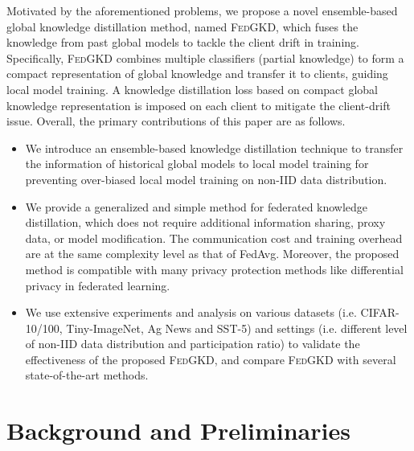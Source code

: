 \documentclass{article} %
\newcommand{\system}{\textsc{FedGKD}\xspace}
\begin{document}
Motivated by the aforementioned problems, we propose a novel ensemble-based global knowledge distillation method, named \system, which fuses the knowledge from past global models to tackle the client drift in training. Specifically, \system combines multiple  classifiers (partial knowledge) to form a compact representation of global knowledge and transfer it to clients, guiding local model training. 
A knowledge distillation loss based on compact global knowledge representation is imposed on each client to mitigate the client-drift issue.
Overall, the primary contributions of this paper are as follows.
\begin{itemize}
    \item We introduce an ensemble-based knowledge distillation technique to transfer the information of historical global models to local model training for preventing over-biased local model training on non-IID data distribution.
    \item We provide a generalized and simple method for federated knowledge distillation, which does not require additional information sharing, proxy data, or model modification. The communication cost and training overhead are at the same complexity level as that of FedAvg. Moreover, the proposed method is compatible with many privacy protection methods like differential privacy in federated learning.
    \item We use extensive experiments and analysis on various datasets (i.e. CIFAR-10/100, Tiny-ImageNet, Ag News and SST-5) and settings (i.e. different level of non-IID data distribution and participation ratio) to validate the effectiveness of the proposed \system, and compare \system with several state-of-the-art methods.
\end{itemize}

\section{Background and Preliminaries}

\end{document}
